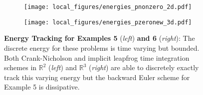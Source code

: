 \documentclass{amsart}
\theoremstyle{thmstyleone}%
\theoremstyle{thmstyletwo}%
\theoremstyle{thmstylethree}%
\def\R{\mathbb{R}}
\begin{document}
\begin{figure}[h]
  \centering
  \begin{subfigure}[t]{0.48\linewidth}
    \centering \texttt{[image: local\_figures/energies\_pnonzero\_2d.pdf]}
  \end{subfigure}
  \hspace{0.025\linewidth}
  \begin{subfigure}[t]{0.48\linewidth}
    \centering \texttt{[image: local\_figures/energies\_pzeronew\_3d.pdf]}
  \end{subfigure}
  \caption{\textbf{Energy Tracking for Examples 5} (\textit{left}) \textbf{and 6} (\textit{right}): The discrete energy for these problems is time varying but bounded. Both Crank-Nicholson and implicit leapfrog time integration schemes in $\R^2$ (\textit{left}) and $\R^3$ (\textit{right}) are able to discretely exactly track this varying energy but the backward Euler scheme for Example 5 is dissipative.}
  \label{fig:varying_energies}
\end{figure}

\printbibliography
\end{document}
